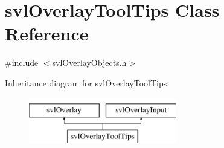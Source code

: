 \hypertarget{classsvl_overlay_tool_tips}{\section{svl\-Overlay\-Tool\-Tips Class Reference}
\label{classsvl_overlay_tool_tips}
}


{\ttfamily \#include $<$svl\-Overlay\-Objects.\-h$>$}

Inheritance diagram for svl\-Overlay\-Tool\-Tips\-:\begin{figure}[H]
\begin{center}
\leavevmode
\includegraphics[height=2.000000cm]{d5/dc1/classsvl_overlay_tool_tips}
\end{center}
\end{figure}
